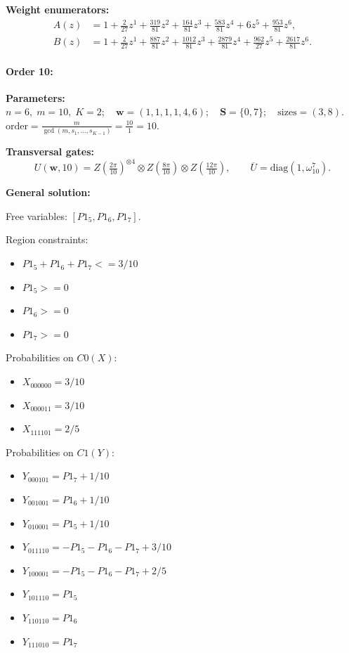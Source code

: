 \documentclass[11pt]{article}
\begin{document}
\noindent\textbf{Weight enumerators:}
\begin{align*}
A(z) &= 1 + \tfrac{2}{27}z^{1} + \tfrac{319}{81}z^{2} + \tfrac{164}{81}z^{3} + \tfrac{583}{81}z^{4} + 6z^{5} + \tfrac{953}{81}z^{6},\\[2pt]
B(z) &= 1 + \tfrac{2}{27}z^{1} + \tfrac{887}{81}z^{2} + \tfrac{1012}{81}z^{3} + \tfrac{2879}{81}z^{4} + \tfrac{962}{27}z^{5} + \tfrac{2617}{81}z^{6}.
\end{align*}

\paragraph{\textbf{Order 10:}}
\noindent\textbf{Parameters:} $n=6,\; m=10,\; K=2;\quad \mathbf w=(1, 1, 1, 1, 4, 6);\quad \mathbf S=\{0, 7\};\quad \text{sizes}=\left(3, 8\right).$ $\displaystyle \text{order}=\frac{m}{\gcd(m,s_1,\dots,s_{K-1})}=\frac{10}{1}=10.$

\noindent\textbf{Transversal gates:}
\[
    U(\mathbf w,10)=Z \left(\tfrac{2\pi}{10}\right)^{\otimes4} \otimes Z \left(\tfrac{8\pi}{10}\right) \otimes Z \left(\tfrac{12\pi}{10}\right),\qquad
    \overline U=\mathrm{diag}(1,\omega_{10}^{7}).
\]

\noindent\textbf{General solution:}

Free variables: $[P1_5, P1_6, P1_7]$.

Region constraints:
\begin{itemize}
    \item $P1_5 + P1_6 + P1_7 <= 3/10$
    \item $P1_5 >= 0$
    \item $P1_6 >= 0$
    \item $P1_7 >= 0$
\end{itemize}

Probabilities on $C0 (X)$:
\begin{itemize}
    \item $X_{000000} = 3/10$
    \item $X_{000011} = 3/10$
    \item $X_{111101} = 2/5$
\end{itemize}

Probabilities on $C1 (Y)$:
\begin{itemize}
    \item $Y_{000101} = P1_7 + 1/10$
    \item $Y_{001001} = P1_6 + 1/10$
    \item $Y_{010001} = P1_5 + 1/10$
    \item $Y_{011110} = -P1_5 - P1_6 - P1_7 + 3/10$
    \item $Y_{100001} = -P1_5 - P1_6 - P1_7 + 2/5$
    \item $Y_{101110} = P1_5$
    \item $Y_{110110} = P1_6$
    \item $Y_{111010} = P1_7$
\end{itemize}
\end{document}
